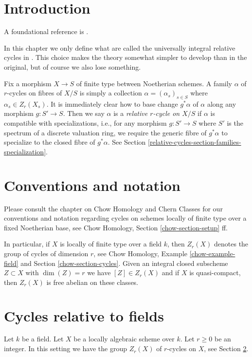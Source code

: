 \section{Introduction}
\label{relative-cycles-section-introduction}
A foundational reference is \cite{SV}.

\medskip\noindent
In this chapter we only define what are called the universally integral
relative cycles in \cite{SV}. This choice makes the theory somewhat
simpler to develop than in the original, but of course we also lose something.

\medskip\noindent
Fix a morphism $X \to S$ of finite type
between Noetherian schemes. A family $\alpha$ of $r$-cycles on fibres
of $X/S$ is simply a collection $\alpha = (\alpha_s)_{s \in S}$
where $\alpha_s \in Z_r(X_s)$. It is immediately clear how to
base change $g^*\alpha$ of $\alpha$ along any morphism $g : S' \to S$.
Then we say $\alpha$ is a {\it relative $r$-cycle on $X/S$}
if $\alpha$ is compatible with specializations, i.e., for any
morphism $g : S' \to S$ where $S'$ is the spectrum of a discrete
valuation ring, we require the generic fibre of $g^*\alpha$
to specialize to the closed fibre of $g^*\alpha$.
See Section \ref{relative-cycles-section-families-specialization}.

\section{Conventions and notation}
\label{relative-cycles-section-conventions}
Please consult the chapter on Chow Homology and Chern Classes
for our conventions and notation regarding cycles on schemes
locally of finite type over a fixed Noetherian base, see
Chow Homology, Section \ref{chow-section-setup} ff.

\medskip\noindent
In particular, if $X$ is locally of finite type over a field $k$,
then $Z_r(X)$ denotes the group of cycles of dimension $r$, see
Chow Homology, Example \ref{chow-example-field} and
Section \ref{chow-section-cycles}. Given an integral closed
subscheme $Z \subset X$ with $\dim(Z) = r$ we have $[Z] \in Z_r(X)$
and if $X$ is quasi-compact, then $Z_r(X)$ is free abelian on these classes.

\section{Cycles relative to fields}
\label{relative-cycles-section-relative-fields}
Let $k$ be a field. Let $X$ be a locally algebraic scheme over $k$.
Let $r \geq 0$ be an integer. In this setting we have the group
$Z_r(X)$ of $r$-cycles on $X$, see Section \ref{relative-cycles-section-conventions}.

